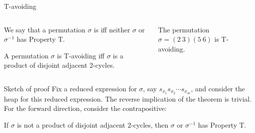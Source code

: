 \documentclass[9pt]{beamer}
\begin{document}
\begin{frame}{T-avoiding}

\begin{columns}
\begin{column}{.47\linewidth}
\begin{definition}
We say that a permutation $\sigma$ is  iff neither $\sigma$ or $\sigma^{-1}$ has Property T.
\end{definition}

\begin{theorem}[CEGKM]
A permutation $\sigma$ is T-avoiding iff $\sigma$ is a product of disjoint adjacent 2-cycles.
\end{theorem}

\end{column}

\begin{column}{.47\linewidth}

\begin{example}
The permutation $\sigma=(2\ 3)(5\ 6)$ is T-avoiding.
\begin{figure}
\end{figure}
\end{example}

\end{column}

\end{columns}

\begin{block}{Sketch of proof}
Fix a reduced expression for $\sigma$, say $s_{x_1}s_{x_2}\cdots s_{x_m}$, and consider the heap for this reduced expression.  The reverse implication of the theorem is trivial.  For the forward direction, consider the contrapositive: 

\vspace{1em}

If $\sigma$ is not a product of disjoint adjacent 2-cycles, then $\sigma$ or $\sigma^{-1}$ has Property T.
\end{block}

\end{frame}
\end{document}
